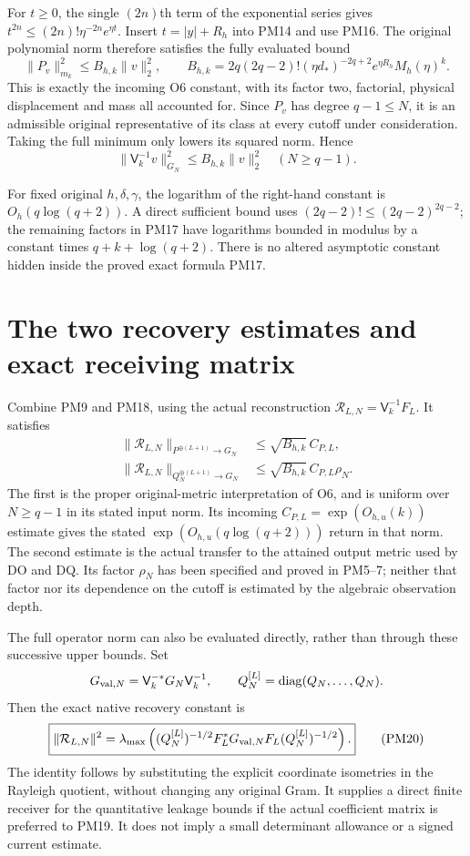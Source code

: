 \documentclass[11pt]{article}
\newcommand{\diag}{\operatorname{diag}}
\begin{document}
For $t\ge0$, the single $(2n)$th term of the exponential series
gives $t^{2n}\le(2n)!\eta^{-2n}e^{\eta t}$.  Insert
$t=|y|+R_h$ into PM14 and use PM16.  The original polynomial
norm therefore satisfies the fully evaluated bound
\[
 \boxed{\|P_v\|_{m_k}^2\le B_{h,k}\|v\|_2^2,\qquad
 B_{h,k}=2q(2q-2)!(\eta d_*)^{-2q+2}
                    e^{\eta R_h}M_h(\eta)^k.}                 \tag{PM17}
\]
This is exactly the incoming O6 constant, with its factor two,
factorial, physical displacement and mass all accounted for.
Since $P_v$ has degree $q-1\le N$, it is an admissible original
representative of its class at every cutoff under consideration.
Taking the full minimum only lowers its squared norm.  Hence
\[
 \|\mathsf V_k^{-1}v\|_{G_N}^2\le B_{h,k}\|v\|_2^2
                           \quad(N\ge q-1).                   \tag{PM18}
\]

For fixed original $h,\delta,\gamma$, the logarithm of the
right-hand constant is $O_h(q\log(q+2))$.  A direct sufficient
bound uses $(2q-2)!\le(2q-2)^{2q-2}$; the remaining factors in
PM17 have logarithms bounded in modulus by a constant times
$q+k+\log(q+2)$.  There is no altered asymptotic constant hidden
inside the proved exact formula PM17.

\section{The two recovery estimates and exact receiving matrix}
Combine PM9 and PM18, using the actual reconstruction
$\mathcal R_{L,N}=\mathsf V_k^{-1}F_L$.  It satisfies
\[
 \begin{split}
 \|\mathcal R_{L,N}\|_{P^{\oplus(L+1)}\to G_N}
      &\le\sqrt{B_{h,k}}\,C_{P,L},\\
 \|\mathcal R_{L,N}\|_{Q_N^{\oplus(L+1)}\to G_N}
      &\le\sqrt{B_{h,k}}\,C_{P,L}\rho_N.
 \end{split}                                                     \tag{PM19}
\]
The first is the proper original-metric interpretation of O6,
and is uniform over $N\ge q-1$ in its stated input norm.  Its
incoming $C_{P,L}=\exp(O_{h,u}(k))$ estimate gives the stated
$\exp(O_{h,u}(q\log(q+2)))$ return in that norm.  The second
estimate is the actual transfer to the attained output metric
used by DO and DQ.  Its factor $\rho_N$ has been specified and
proved in PM5--7; neither that factor nor its dependence on the
cutoff is estimated by the algebraic observation depth.

The full operator norm can also be evaluated directly, rather
than through these successive upper bounds.  Set
\[
 G_{{\rm val},N}=\mathsf V_k^{-*}G_N\mathsf V_k^{-1},\qquad
 Q_N^{[L]}=\diag(Q_N,\ldots,Q_N).
\]
Then the exact native recovery constant is
\[
 \boxed{\|\mathcal R_{L,N}\|^2
 =\lambda_{\max}\left((Q_N^{[L]})^{-1/2}
          F_L^*G_{{\rm val},N}F_L(Q_N^{[L]})^{-1/2}\right).}     \tag{PM20}
\]
The identity follows by substituting the explicit coordinate
isometries in the Rayleigh quotient, without changing any
original Gram.  It supplies a direct finite receiver for the
quantitative leakage bounds if the actual coefficient matrix
is preferred to PM19.  It does not imply a small determinant
allowance or a signed current estimate.
\end{document}
